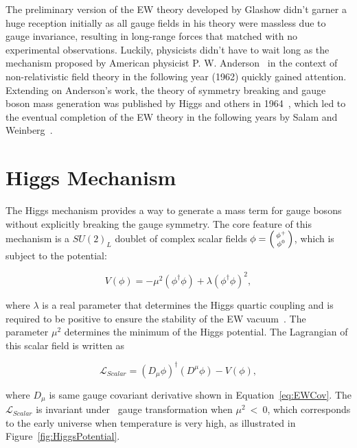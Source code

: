 The preliminary version of the \ac{EW} theory developed by Glashow didn't garner a huge reception initially as all gauge fields in his theory were massless due to gauge invariance, resulting in long-range forces that matched with no experimental observations. Luckily, physicists didn't have to wait long as the mechanism proposed by American physicist P. W. Anderson~\cite{Anderson:1963pc} in the context of non-relativistic field theory in the following year (1962) quickly gained attention. Extending on Anderson's work, the theory of symmetry breaking and gauge boson mass generation was published by Higgs and others in 1964~\cite{PhysRevLett.13.321,PhysRevLett.13.508,PhysRevLett.13.585}, which led to the eventual completion of the \ac{EW} theory in the following years by Salam and Weinberg~\cite{Salam:1964ry,Weinberg:1967tq}.

\section{Higgs Mechanism}
\label{sec:Higgs}

The Higgs mechanism provides a way to generate a mass term for gauge bosons without explicitly breaking the gauge symmetry. The core feature of this mechanism is a $SU(2)_{L}$ doublet of complex scalar fields $\phi=\begin{psmallmatrix}\phi^{+}\\\phi^{0}\end{psmallmatrix}$, which is subject to the potential:

\begin{equation}
V(\phi)=-\mu^2(\phi^{\dagger}\phi)+\lambda(\phi^{\dagger}\phi)^2,
\end{equation}

where $\lambda$ is a real parameter that determines the Higgs quartic coupling and is required to be positive to ensure the stability of the \ac{EW} vacuum~\cite{Cabibbo:1979ay}. The parameter $\mu^2$ determines the minimum of the Higgs potential. The Lagrangian of this scalar field is written as 

\begin{equation}
\mathcal{L}_{Scalar}=(D_{\mu}\phi)^{\dagger}(D^{\mu}\phi)-V(\phi),
\end{equation}

where $D_{\mu}$ is same gauge covariant derivative shown in Equation~\ref{eq:EWCov}. The $\mathcal{L}_{Scalar}$ is invariant under \ew~gauge transformation when $\mu^2~<~0$, which corresponds to the early universe when temperature is very high, as illustrated in Figure~\ref{fig:HiggsPotential}.

